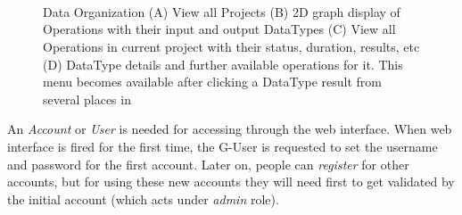  \begin{figure}[!htbp]
 	\centering
	\\
	\\
	\\
	\caption{\TVB Data Organization
	(A) View all Projects
	(B) 2D graph display of Operations with their input and output DataTypes 
	(C) View all Operations in current project with their status, duration, results, etc
	(D) DataType details and further available operations for it. This menu becomes available after clicking a DataType result from several places in \TVB }
        \label{fig:project}
\end{figure}

 An \emph{Account} or \emph{User} is needed for accessing  \TVB through the web interface. 
 When \TVB web interface is fired for the first time, the G-User is requested to set the username and password for the first account.
Later on, people can \emph{register} for other accounts, but for using these new accounts they will need first to get validated by the 
initial account (which acts under \emph{admin} role).

